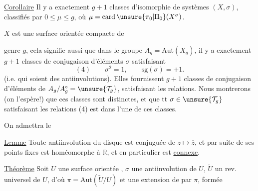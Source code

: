 
\uline{Corollaire} Il y a exactement $g+1$ classes d'isomorphie de systèmes $(X,\sigma)$, classifiés par $0\leq\mu\leq g$, où $\mu=\operatorname{card}\unsure{\pi_0|\Pi_0}(X^\sigma)$.


$X$  est une surface orientée compacte de



genre $g$, cela signifie aussi que dans le groupe $A_g=\mathrm{Aut}(X_g)$, il y a exactement $g+1$ classes de conjugaison d'éléments $\sigma$ satisfaisant
\[
(4)\qquad \sigma^2=1,\qquad \mathrm{sg}(\sigma)=+1.
\]
(i.e. qui soient des antiinvolutions). Elles fournissent $g+1$ classes de conjugaison d'éléments de $A_g/A_g^\circ=\unsure{\mathcal{T}_g}$, satisfaisant les  relations. Nous montrerons (on l'espère!) que ces classes sont distinctes, et que tt $\sigma\in\unsure{\mathcal{T}_g}$ satisfaisant les relations (4) est dans l'une de ces classes.

On admettra le

\uline{Lemme} Toute antiinvolution du disque   est conjuguée de $z\mapsto\overline z$, et par suite  de ses points fixes est homéomorphe à $\mathbb R$, et en particulier est \uline{connexe}.

\uline{Théorème} Soit $U$ une surface orientée ,  $\sigma$ une antiinvolution de $U$, $\widetilde U$ un rev. universel de $U$, d'où $\pi=\mathrm{Aut}(\widetilde U/U)$ et une extension  de  par $\pi$, formée
